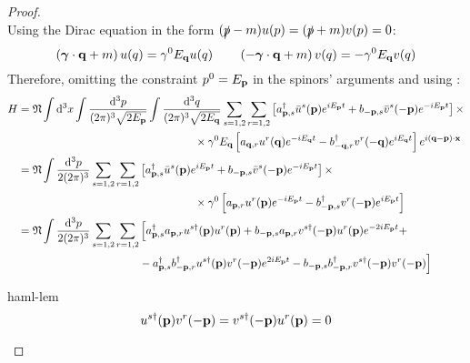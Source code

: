 \begin{proofbox}
\begin{proof}
\begin{equation*}
    \end{equation*}
    Using the Dirac equation in the form $ (\slashed{p} - m) u(p) = (\slashed{p} + m) v(p) = 0 $:
    \begin{equation*}
      \left( \boldsymbol{\gamma} \cdot \mathbf{q} + m \right) u(q) = \gamma^0 E_{\mathbf{q}} u(q)
      \qquad
      \left( -\boldsymbol{\gamma} \cdot \mathbf{q} + m \right) v(q) = - \gamma^0 E_{\mathbf{q}} v(q)
    \end{equation*}
    Therefore, omitting the constraint $ p^0 = E_{\mathbf{p}} $ in the spinors' arguments and using :
    \begin{equation*}
      \begin{split}
        H
        &= \mathfrak{N} \int \mathrm{d}^3x \int \frac{\mathrm{d}^3p}{(2\pi)^3 \sqrt{2E_{\mathbf{p}}}} \int \frac{\mathrm{d}^3q}{(2\pi)^3 \sqrt{2E_{\mathbf{q}}}} \sum_{s = 1,2} \sum_{r = 1,2} \left[ a_{\mathbf{p},s}^\dagger \bar{u}^s(\mathbf{p}) e^{i E_{\mathbf{p}} t} + b_{-\mathbf{p},s} \bar{v}^s(-\mathbf{p}) e^{-i E_{\mathbf{p}} t} \right] \times \\
        & \qquad \qquad \qquad \qquad \qquad \qquad \qquad \qquad \times \gamma^0 E_{\mathbf{q}} \left[ a_{\mathbf{q},r} u^r(\mathbf{q}) e^{-i E_{\mathbf{q}} t} - b_{-\mathbf{q},r}^\dagger v^r(-\mathbf{q}) e^{i E_{\mathbf{q}} t} \right] e^{i (\mathbf{q} - \mathbf{p}) \cdot \mathbf{x}} \\
        &= \mathfrak{N} \int \frac{\mathrm{d}^3p}{2(2\pi)^3} \sum_{s = 1,2} \sum_{r = 1,2} \left[ a_{\mathbf{p},s}^\dagger \bar{u}^s(\mathbf{p}) e^{i E_{\mathbf{p}} t} + b_{-\mathbf{p},s} \bar{v}^s(-\mathbf{p}) e^{-i E_{\mathbf{p}} t} \right] \times \\
        & \qquad \qquad \qquad \qquad \qquad \qquad \qquad \qquad \times \gamma^0 \left[ a_{\mathbf{p},r} u^r(\mathbf{p}) e^{-i E_{\mathbf{p}} t} - b_{-\mathbf{p},s}^\dagger v^r(-\mathbf{p}) e^{i E_{\mathbf{p}} t} \right] \\
        &= \mathfrak{N} \int \frac{\mathrm{d}^3p}{2(2\pi)^3} \sum_{s = 1,2} \sum_{r = 1,2} \Big[ a_{\mathbf{p},s}^\dagger a_{\mathbf{p},r} u^{s\dagger}(\mathbf{p}) u^r(\mathbf{p}) + b_{-\mathbf{p},s} a_{\mathbf{p},r} v^{s\dagger}(-\mathbf{p}) u^r(\mathbf{p}) e^{-2i E_{\mathbf{p}} t} + \\
        & \qquad \qquad \qquad \qquad \qquad \quad - a_{\mathbf{p},s}^\dagger b_{-\mathbf{p},r}^\dagger u^{s\dagger}(\mathbf{p}) v^r(-\mathbf{p}) e^{2i E_{\mathbf{p}} t} - b_{-\mathbf{p},s} b_{-\mathbf{p},r}^\dagger v^{s\dagger}(-\mathbf{p}) v^r(-\mathbf{p}) \Big]
      \end{split}
    \end{equation*}

    \begin{lemma}[before upper = {\tcbtitle}]{}{haml-lem}
      \begin{equation*}
        u^{s\dagger}(\mathbf{p}) v^r(-\mathbf{p}) = v^{s\dagger}(-\mathbf{p}) u^r(\mathbf{p}) = 0
      \end{equation*}
    \end{lemma}


\end{proof}
\end{proofbox}

